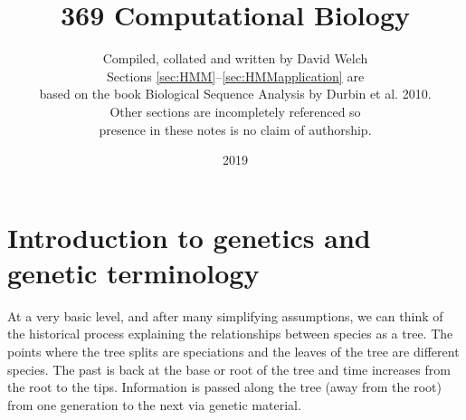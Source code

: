 \documentclass[11pt]{article}
\title{369 Computational Biology}
\author{Compiled, collated and written by David Welch\\ 
Sections \ref{sec:HMM}--\ref{sec:HMMapplication} are\\ based on the book Biological Sequence Analysis by Durbin et al. 2010. \\ Other sections are incompletely referenced so \\ presence in these notes is no claim of authorship.}
\date{2019}                                           %
\begin{document}
\maketitle

%
%

\tableofcontents
\newpage





%


\section{Introduction to genetics and genetic terminology }


At a very basic level, and after many simplifying assumptions, we can think of the historical process explaining the relationships between species as a tree.   The points where the tree splits are speciations and the leaves of the tree are different  species.  The past is back at the base or root of the tree and time increases from the root to the tips.  Information is passed along  the tree (away from the root) from one generation to the next via genetic material.
\end{document}
